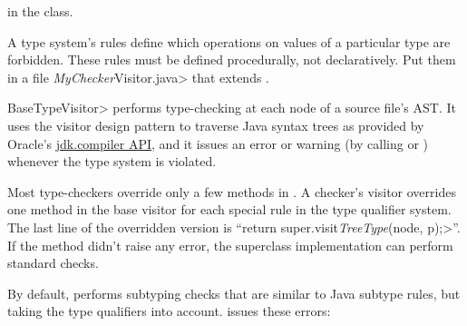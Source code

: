 in the  class.




A type system's rules define which operations on values of a
particular type are forbidden.
These rules must be defined procedurally, not declaratively.
Put them in a file \<\emph{MyChecker}Visitor.java> that extends
.

\<BaseTypeVisitor> performs type-checking at each node of a
source file's AST\@.  It uses the visitor design pattern to traverse
Java syntax trees as provided by Oracle's
\href{https://docs.oracle.com/en/java/javase/25/docs/api/jdk.compiler/module-summary.html}{jdk.compiler
API},
and it issues an error or warning (by calling
or
)
whenever the type system is violated.

Most type-checkers
override only a few methods in .
A checker's visitor overrides one method in the base visitor for each special
rule in the type qualifier system.
The last line of the overridden version is
``\<return super.visit\emph{TreeType}(node, p);>''.
If the method didn't raise any error,
the superclass implementation can perform standard checks.


By default,  performs subtyping checks that are
similar to Java subtype rules, but taking the type qualifiers into account.
 issues these errors:

